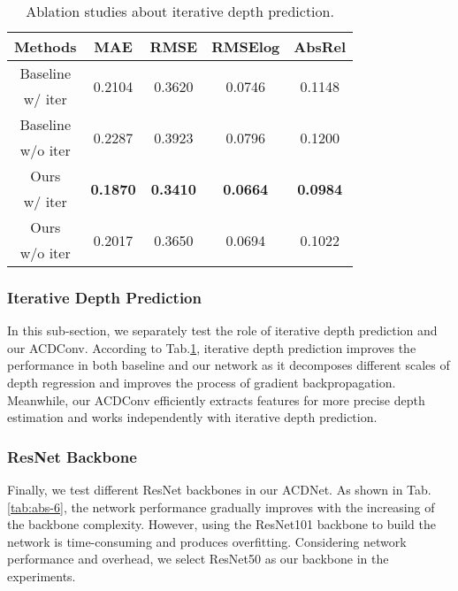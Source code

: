 \documentclass[letterpaper]{article} \usepackage{aaai21}  \usepackage{times}  \usepackage{helvet} \usepackage{courier}  \usepackage[hyphens]{url}  \usepackage{graphicx} \urlstyle{rm} \def\UrlFont{\rm}  \usepackage{natbib}  \usepackage{caption} \frenchspacing  \setlength{\pdfpagewidth}{8.5in}  \setlength{\pdfpageheight}{11in}
\newcommand{\newchange}[1]{{\color{black}#1}}
\begin{document}
\begin{table}[tb]
    \centering
    \begin{tabular}{ccccc} 
\toprule 
Methods & MAE & RMSE & RMSElog &  AbsRel \\
\midrule 
\small{Baseline} & \multirow{2}{*}{0.2104} & \multirow{2}{*}{0.3620} & \multirow{2}{*}{0.0746} & \multirow{2}{*}{0.1148} \\
\small{w/ iter} & ~ & ~ & ~ & ~\\
\small{Baseline} & \multirow{2}{*}{0.2287} & \multirow{2}{*}{0.3923} & \multirow{2}{*}{0.0796} & \multirow{2}{*}{0.1200}\\
\small{w/o iter} & ~ & ~ & ~ & ~\\
\small{Ours}   & \multirow{2}{*}{\textbf{0.1870}} & \multirow{2}{*}{\textbf{0.3410}} & \multirow{2}{*}{\textbf{0.0664}} & \multirow{2}{*}{\textbf{0.0984}} \\
\small{w/ iter} & ~ & ~ & ~ & ~\\
\small{Ours} & \multirow{2}{*}{0.2017} & \multirow{2}{*}{0.3650} & \multirow{2}{*}{0.0694} & \multirow{2}{*}{0.1022} \\
\small{w/o iter} & ~ & ~ & ~ & ~\\
\bottomrule
    \end{tabular}
    \caption{Ablation studies about iterative depth prediction.}
    \label{tab:abs-5}
\end{table}

\newchange{
\subsubsection{Iterative Depth Prediction}
In this sub-section, we separately test the role of iterative depth prediction and our ACDConv.
According to Tab.\ref{tab:abs-5}, iterative depth prediction improves the performance in both baseline and our network as it decomposes different scales of depth regression and improves the process of gradient backpropagation. 
Meanwhile, our ACDConv efficiently extracts features for more precise depth estimation and works independently with iterative depth prediction.
}






\subsubsection{ResNet Backbone}
Finally, we test different ResNet backbones in our ACDNet. As shown in Tab.\ref{tab:abs-6}, the network performance gradually improves with the increasing of the backbone complexity. However, using the ResNet101 backbone to build the network is time-consuming and produces overfitting. Considering network performance and overhead, we select ResNet50 as our backbone in the experiments.
\end{document}

